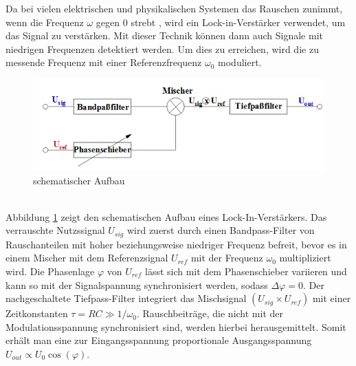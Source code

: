 Da bei vielen elektrischen und physikalischen Systemen das Rauschen zunimmt, wenn
die Frequenz $\omega$ gegen 0 strebt \cite{enet}, wird ein Lock-in-Verstärker
verwendet, um das Signal zu verstärken. Mit dieser Technik können dann auch
Signale mit niedrigen Frequenzen detektiert werden. Um dies zu erreichen, wird die
zu messende Frequenz mit einer Referenzfrequenz $\omega_0$ moduliert. \\
\begin{figure}[h]
  \includegraphics{Bilder/Schema.jpg}
  \caption{schematischer Aufbau}
  \label{fig:schema}
\end{figure} \\
Abbildung \ref{fig:schema} zeigt den schematischen Aufbau eines Lock-In-Verstärkers.
Das verrauschte Nutzssignal $U_{sig}$ wird zuerst durch einen Bandpass-Filter
von Rauschanteilen mit hoher beziehungsweise niedriger Frequenz befreit, bevor
es in einem Mischer mit dem Referenzsignal $U_{ref}$ mit der Frequenz $\omega_0$
multipliziert wird. Die Phasenlage $\varphi$ von $U_{ref}$ lässt sich mit dem
Phasenschieber variieren und kann so mit der Signalspannung synchronisiert werden,
sodass $\Delta\varphi =0$.
Der nachgeschaltete Tiefpass-Filter integriert das Mischsignal $(U_{sig}\times U_{ref})$
mit einer Zeitkonstanten $\tau = RC \gg 1/\omega_0$.
Rauschbeiträge, die nicht mit der Modulationsspannung synchronisiert sind, werden
hierbei herausgemittelt. Somit erhält man eine zur Eingangsspannung proportionale
Ausgangsspannung $U_{out} \propto U_0 \cos(\varphi)$.

